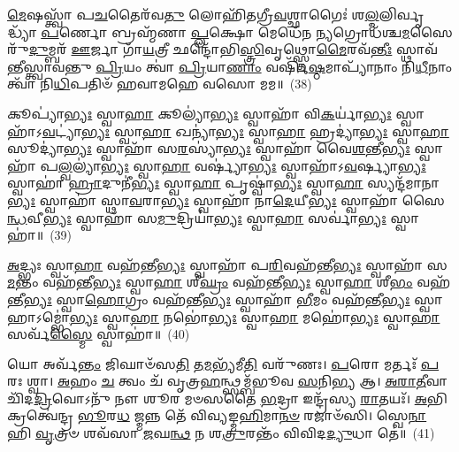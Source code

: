 {\anuvakamend[{\-\ul{𑌵𑌿}\-𑌰𑌾𑌜᳴\-\ul{𑌮𑍇}\-𑌤𑍇𑌨᳴ 𑌦𑍍𑌵𑌾\-\ul{𑌦}\-𑌶𑌾\-\ul{𑌵𑍇}\-𑌤𑌾\-\ul{𑌵}\-𑌦𑍍𑌵𑌾 \ul{𑌅}\-𑌷𑍍𑌟𑍗 𑌚᳴}]}%

\-\ul{𑌮𑍇}\-𑌷𑌸𑍍𑌤𑍍𑌵𑌾᳴ 𑌪\-\ul{𑌚}\-𑌤𑍈𑌰᳴𑌵\-\ul{𑌤𑍁} 𑌲𑍋𑌹𑌿᳴𑌤𑌗𑍍𑌰𑍀\-\ul{𑌵}\-𑌶𑍍𑌛𑌾𑌗𑍈𑌃॑ 𑌶\-\ul{𑌲𑍍𑌮}\-𑌲𑌿𑌰𑍍𑌵𑍃𑌦𑍍𑌧𑍍𑌯𑌾᳴ \ul{𑌪}\-𑌰𑍍𑌣𑍋 𑌬𑍍𑌰𑌹𑍍𑌮᳴𑌣𑌾 \ul{𑌪𑍍𑌲}\-𑌕𑍍𑌷𑍋 𑌮𑍇𑌧𑍇᳴𑌨 \ul{𑌨𑍍𑌯}\-𑌗𑍍𑌰𑍋𑌧᳴𑌶𑍍𑌚\-\ul{𑌮}\-𑌸𑍈𑌰𑍁᳴\-\ul{𑌦𑍁}\-𑌮𑍍𑌬𑌰᳴ \ul{𑌊}\-𑌰𑍍𑌜𑌾 𑌗𑌾᳴\-\ul{𑌯}\-𑌤𑍍𑌰𑍀 𑌛𑌨𑍍𑌦𑍋᳴𑌭𑌿\-\ul{𑌸𑍍𑌤𑍍𑌰𑌿}\-𑌵𑍃𑌥𑍍𑌸𑍍𑌤𑍋\-\ul{𑌮𑍈}\-𑌰𑌵᳴\-\ul{𑌨𑍍𑌤𑍀𑌃} 𑌸𑍍𑌥𑌾𑌵᳴𑌨𑍍𑌤𑍀𑌸𑍍𑌤𑍍𑌵𑌾𑌵𑌨𑍍𑌤𑍁 \ul{𑌪𑍍𑌰𑌿}\-𑌯𑌂 𑌤𑍍𑌵𑌾॑ \ul{𑌪𑍍𑌰𑌿}\-𑌯𑌾\-\ul{𑌣𑌾𑌂} 𑌵𑌰𑍍\mbox{}𑌷𑌿᳴\-\ul{𑌷𑍍𑌠}\-𑌮𑌾𑌪𑍍𑌯𑌾᳴𑌨𑌾𑌂 𑌨𑌿\-\ul{𑌧𑍀}\-𑌨𑌾𑌂 𑌤𑍍𑌵𑌾᳴ 𑌨𑌿\-\ul{𑌧𑌿}\-𑌪𑌤𑌿𑍞᳴ 𑌹𑌵𑌾𑌮𑌹𑍇 𑌵𑌸𑍋 𑌮𑌮॥~(38)

{\anuvakamend[{\-\ul{𑌮𑍇}\-𑌷𑌃 𑌷𑌟𑍍𑌤𑍍𑌰𑌿𑍞᳴𑌶𑌤𑍍}]}%

𑌕𑍂𑌪𑍍𑌯𑌾॑\-\ul{𑌭𑍍𑌯𑌃} 𑌸𑍍𑌵𑌾\-\ul{𑌹𑌾} 𑌕𑍂𑌲𑍍𑌯𑌾॑\-\ul{𑌭𑍍𑌯𑌃} 𑌸𑍍𑌵𑌾𑌹𑌾᳴ 𑌵𑌿\-\ul{𑌕}\-𑌰𑍍𑌯𑌾॑\-\ul{𑌭𑍍𑌯𑌃} 𑌸𑍍𑌵𑌾𑌹𑌾᳴\-𑌽\-\ul{𑌵}\-𑌟𑍍𑌯𑌾॑\-\ul{𑌭𑍍𑌯𑌃} 𑌸𑍍𑌵𑌾\-\ul{𑌹𑌾} 𑌖𑌨𑍍𑌯𑌾॑\-\ul{𑌭𑍍𑌯𑌃} 𑌸𑍍𑌵𑌾\-\ul{𑌹𑌾} 𑌹𑍍𑌰𑌦𑍍𑌯𑌾॑\-\ul{𑌭𑍍𑌯𑌃} 𑌸𑍍𑌵𑌾\-\ul{𑌹𑌾} 𑌸𑍂𑌦𑍍𑌯𑌾॑\-\ul{𑌭𑍍𑌯𑌃} 𑌸𑍍𑌵𑌾𑌹𑌾᳴ 𑌸\-\ul{𑌰}\-𑌸𑍍𑌯𑌾॑\-\ul{𑌭𑍍𑌯𑌃} 𑌸𑍍𑌵𑌾𑌹𑌾᳴ 𑌵𑍈\-\ul{𑌶}\-𑌨𑍍𑌤𑍀\-\ul{𑌭𑍍𑌯𑌃} 𑌸𑍍𑌵𑌾𑌹𑌾᳴ 𑌪\-\ul{𑌲𑍍𑌵}\-𑌲𑍍𑌯𑌾॑\-\ul{𑌭𑍍𑌯𑌃} 𑌸𑍍𑌵𑌾\-\ul{𑌹𑌾} 𑌵𑌰𑍍𑌷𑍍𑌯𑌾॑\-\ul{𑌭𑍍𑌯𑌃} 𑌸𑍍𑌵𑌾𑌹𑌾᳴\-𑌽\-\ul{𑌵}\-𑌰𑍍𑌷𑍍𑌯𑌾\-\ul{𑌭𑍍𑌯𑌃} 𑌸𑍍𑌵𑌾𑌹𑌾॑ \ul{𑌹𑍍𑌰𑌾}\-𑌦𑍁𑌨𑍀॑\-\ul{𑌭𑍍𑌯𑌃} 𑌸𑍍𑌵𑌾\-\ul{𑌹𑌾} 𑌪𑍃𑌷𑍍𑌵𑌾॑\-\ul{𑌭𑍍𑌯𑌃} 𑌸𑍍𑌵𑌾\-\ul{𑌹𑌾} 𑌸𑍍𑌯𑌨𑍍𑌦᳴𑌮𑌾𑌨𑌾\-\ul{𑌭𑍍𑌯𑌃} 𑌸𑍍𑌵𑌾𑌹𑌾॑ 𑌸𑍍𑌥𑌾\-\ul{𑌵}\-𑌰𑌾\-\ul{𑌭𑍍𑌯𑌃} 𑌸𑍍𑌵𑌾𑌹𑌾᳴ 𑌨𑌾\-\ul{𑌦𑍇}\-𑌯𑍀\-\ul{𑌭𑍍𑌯𑌃} 𑌸𑍍𑌵𑌾𑌹𑌾᳴ 𑌸𑍈\-\ul{𑌨𑍍𑌧}\-𑌵𑍀\-\ul{𑌭𑍍𑌯𑌃} 𑌸𑍍𑌵𑌾𑌹𑌾᳴ 𑌸\-\ul{𑌮𑍁}\-𑌦𑍍𑌰𑌿𑌯𑌾॑\-\ul{𑌭𑍍𑌯𑌃} 𑌸𑍍𑌵𑌾\-\ul{𑌹𑌾} 𑌸𑌰𑍍𑌵𑌾॑\-\ul{𑌭𑍍𑌯𑌃} 𑌸𑍍𑌵𑌾𑌹𑌾॑॥~(39)

{\anuvakamend[{𑌕𑍂𑌪𑍍𑌯𑌾॑𑌭𑍍𑌯𑌶𑍍𑌚𑌤𑍍𑌵𑌾\-\ul{𑌰𑌿}\-\-\ul{𑍞}\-𑌶𑌤𑍍}]}%

\-\ul{𑌅}\-𑌦𑍍𑌭𑍍𑌯𑌃 𑌸𑍍𑌵𑌾\-\ul{𑌹𑌾} 𑌵𑌹᳴𑌨𑍍𑌤𑍀\-\ul{𑌭𑍍𑌯𑌃} 𑌸𑍍𑌵𑌾𑌹𑌾᳴ 𑌪\-\ul{𑌰𑌿}\-𑌵𑌹᳴𑌨𑍍𑌤𑍀\-\ul{𑌭𑍍𑌯𑌃} 𑌸𑍍𑌵𑌾𑌹𑌾᳴ 𑌸\-\ul{𑌮}\-𑌨𑍍𑌤𑌂 𑌵𑌹᳴𑌨𑍍𑌤𑍀\-\ul{𑌭𑍍𑌯𑌃} 𑌸𑍍𑌵𑌾\-\ul{𑌹𑌾} 𑌶𑍀\-\ul{𑌘𑍍𑌰𑌂} 𑌵𑌹᳴𑌨𑍍𑌤𑍀\-\ul{𑌭𑍍𑌯𑌃} 𑌸𑍍𑌵𑌾\-\ul{𑌹𑌾} 𑌶𑍀\-\ul{𑌭𑌂} 𑌵𑌹᳴𑌨𑍍𑌤𑍀\-\ul{𑌭𑍍𑌯𑌃} 𑌸𑍍𑌵𑌾\-\ul{𑌹𑍋}\-𑌗𑍍𑌰𑌂 𑌵𑌹᳴𑌨𑍍𑌤𑍀\-\ul{𑌭𑍍𑌯𑌃} 𑌸𑍍𑌵𑌾𑌹𑌾᳴ \ul{𑌭𑍀}\-𑌮𑌂 𑌵𑌹᳴𑌨𑍍𑌤𑍀\-\ul{𑌭𑍍𑌯𑌃} 𑌸𑍍𑌵𑌾𑌹𑌾\-𑌽𑌮𑍍𑌭𑍋॑\-\ul{𑌭𑍍𑌯𑌃} 𑌸𑍍𑌵𑌾\-\ul{𑌹𑌾} 𑌨𑌭𑍋॑\-\ul{𑌭𑍍𑌯𑌃} 𑌸𑍍𑌵𑌾\-\ul{𑌹𑌾} 𑌮𑌹𑍋॑\-\ul{𑌭𑍍𑌯𑌃} 𑌸𑍍𑌵𑌾\-\ul{𑌹𑌾} 𑌸𑌰𑍍𑌵᳴\-\ul{𑌸𑍍𑌮𑍈} 𑌸𑍍𑌵𑌾𑌹𑌾॑॥~(40)

{\anuvakamend[{\-\ul{𑌅}\-𑌦𑍍𑌭𑍍𑌯 𑌏\-\ul{𑌕𑌾}\-𑌨𑍍𑌨\-\ul{𑌤𑍍𑌰𑌿}\-\-\ul{𑍞}\-𑌶𑌤𑍍}]}%

𑌯𑍋 𑌅𑌰𑍍𑌵᳴\-\ul{𑌨𑍍𑌤𑌂} 𑌜𑌿𑌘𑌾𑍞᳴𑌸\-\ul{𑌤𑌿} 𑌤\-\ul{𑌮}\-𑌭𑍍𑌯᳴𑌮𑍀\-\ul{𑌤𑌿} 𑌵𑌰𑍁᳴𑌣𑌃। \ul{𑌪}\-𑌰𑍋 𑌮𑌰𑍍𑌤𑌃᳴ \ul{𑌪}\-𑌰𑌃 𑌶𑍍𑌵𑌾। \ul{𑌅}\-𑌹𑌂 \ul{𑌚} 𑌤𑍍𑌵𑌂 𑌚᳴ 𑌵𑍃𑌤𑍍𑌰\-\ul{𑌹}\-𑌨𑍍𑌥𑍍𑌸𑌮𑍍𑌬᳴𑌭𑍂𑌵 \ul{𑌸}\-𑌨𑌿\-\ul{𑌭𑍍𑌯} 𑌆। \ul{𑌅}\-\-\ul{𑌰𑌾}\-\-\ul{𑌤𑍀}\-𑌵𑌾 𑌚𑌿᳴𑌦\-\ul{𑌦𑍍𑌰𑌿}\-𑌵𑍋\-𑌽𑌨𑍁᳴ 𑌨𑍗 𑌶𑍂𑌰 𑌮𑍞𑌸𑌤𑍈 \ul{𑌭}\-𑌦𑍍𑌰𑌾 𑌇𑌨𑍍𑌦𑍍𑌰᳴𑌸𑍍𑌯 \ul{𑌰𑌾}\-𑌤𑌯𑌃᳴। \ul{𑌅}\-𑌭𑌿 𑌕𑍍𑌰𑌤𑍍𑌵𑍇॑𑌨𑍍𑌦𑍍𑌰 \ul{𑌭𑍂}\-𑌰\-\ul{𑌧} 𑌜𑍍𑌮𑌨𑍍𑌨 𑌤𑍇᳴ 𑌵𑌿𑌵𑍍𑌯𑌙𑍍𑌮\-\ul{𑌹𑌿}\-𑌮𑌾\-\ul{𑌨}\-\-\ul{𑍞} 𑌰𑌜𑌾𑍞᳴𑌸𑌿। 𑌸𑍍𑌵𑍇\-\ul{𑌨𑌾} 𑌹𑌿 \ul{𑌵𑍃}\-𑌤𑍍𑌰𑍞 𑌶𑌵᳴𑌸𑌾 \ul{𑌜}\-𑌘\-\ul{𑌨𑍍𑌥} 𑌨 𑌶\-\ul{𑌤𑍍𑌰𑍁}\-𑌰𑌨𑍍𑌤𑌂᳴ 𑌵𑌿𑌵𑌿𑌦\-\ul{𑌦𑍍𑌯𑍁}\-𑌧𑌾 𑌤𑍇॑॥~(41)

